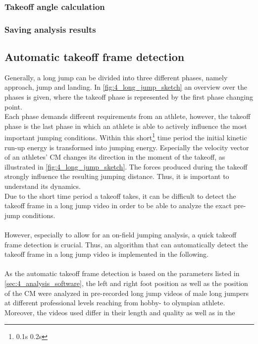 \subsubsection*{Takeoff angle calculation}
\subsubsection*{Saving analysis results}

\subsection{Automatic takeoff frame detection}\label{subsec:4_takeoff_detection}
Generally, a long jump can be divided into three different phases, namely
approach, jump and landing.
In \autoref{fig:4_long_jump_sketch} an overview over the phases is given,
where the takeoff phase is represented by the first phase changing point.\\
Each phase demands different requirements from an athlete, however, the
takeoff phase is the last phase in which an athlete is able to actively
influence the most important jumping conditions.
Within this short\footnote{0.1s \- 0.2s\cite{mechanical_power_long_jump}} time
period the initial kinetic run-up energy is transformed into jumping energy.
Especially the velocity vector of an athletes' \ac{CM} changes its direction
in the moment of the takeoff, as illustrated in
\autoref{fig:4_long_jump_sketch}.
The forces produced during the takeoff strongly influence the resulting
jumping distance. 
Thus, it is important to understand its dynamics.\\
Due to the short time period a takeoff takes, it can be difficult to detect
the takeoff frame in a long jump video in order to be able to analyze the
exact pre-jump conditions.\\\\
However, especially to allow for an on-field jumping analysis, a quick takeoff
frame detection is crucial.
Thus, an algorithm that can automatically detect the takeoff frame in a long
jump video is implemented in the following.\\\\
As the automatic takeoff frame detection is based on the parameters listed in
\autoref{sec:4_analysis_software}, the left and right
foot position as well as the position of the \ac{CM} were analyzed in
pre-recorded long jump videos of male long jumpers at different professional
levels reaching from hobby- to olympian athlete.
Moreover, the videos used differ in their length and quality as well as in the
